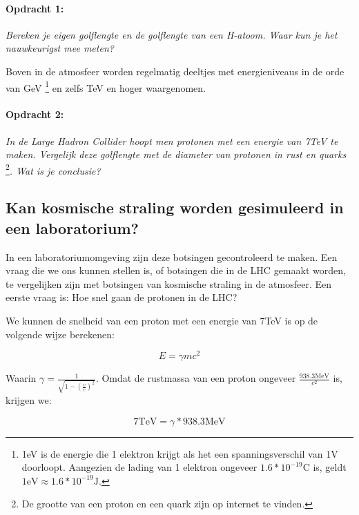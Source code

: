 \paragraph*{Opdracht 1:}

\emph{Bereken je eigen golflengte en de golflengte van een H-atoom.
Waar kun je het nauwkeurigst mee meten?}

Boven in de atmosfeer worden regelmatig deeltjes met energieniveaus in
de orde van GeV \footnote{1eV is de energie die 1 elektron krijgt als
het een spanningsverschil van 1V doorloopt. Aangezien de lading van 1
elektron ongeveer $1.6*10^{-19}\mathrm{C}$ is, geldt
$1\mathrm{eV}\approx1.6*10^{-19}\mathrm{J}$.} en zelfs TeV en hoger
waargenomen.


\paragraph*{Opdracht 2:}

\emph{In de Large Hadron Collider hoopt men protonen met een energie van
7TeV te maken. Vergelijk deze golflengte met de diameter van protonen in
rust en quarks} \footnote{De grootte van een proton en een quark zijn op
internet te vinden.}\emph{. Wat is je conclusie?}


\subsection{Kan kosmische straling worden gesimuleerd in een laboratorium?}

In een laboratoriumomgeving zijn deze botsingen gecontroleerd te maken.
Een vraag die we ons kunnen stellen is, of botsingen die in de LHC
gemaakt worden, te vergelijken zijn met botsingen van kosmische straling
in de atmosfeer. Een eerste vraag is: Hoe snel gaan de protonen in
de LHC?

We kunnen de snelheid van een proton met een energie van 7TeV is op
de volgende wijze berekenen:

\begin{equation}
E=\gamma mc^{2}
\end{equation}


Waarin $\gamma=\frac{1}{\sqrt{1-\left(\frac{v}{c}\right)^{2}}}$.
Omdat de rustmassa van een proton ongeveer $\frac{938.3\mathrm{MeV}}{c^{2}}$
is, krijgen we:

\begin{equation}
7\mathrm{TeV}=\gamma*938.3\mathrm{MeV}
\end{equation}


